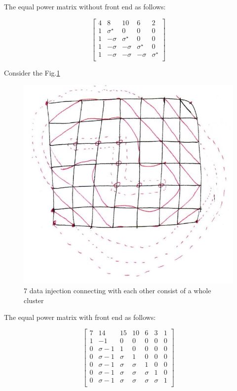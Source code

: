 The equal power matrix without front end as follows:

\begin{equation}
{
\left[ \begin{array}{ccccc}
4 & 8 & 10 & 6 & 2 \\
1 & {\sigma}^{\star} & 0 & 0 & 0 \\
1 & -\sigma & {\sigma}^{\star} & 0 & 0  \\
1 & -\sigma & -\sigma & {\sigma}^{\star} & 0  \\
1 & -\sigma & -\sigma & -\sigma & {\sigma}^{\star}\\

\end{array} 
\right ]} 
\end{equation}

\vspace*{50pt}

Consider the Fig.\ref{dense2}
\begin{figure}[h]
\centering\includegraphics[width=0.8\linewidth]{figure/dense2}
\caption{7 data injection connecting with each other consist of a whole cluster}
\label{dense2}
\end{figure}

\vspace*{20pt}
The equal power matrix with front end as follows:

\begin{equation}
{
\left[ \begin{array}{ccccccc}
7 & 14 & 15 & 10 & 6 & 3 & 1 \\
1 & -1 & 0 & 0 & 0 & 0 & 0\\
0 & \sigma -1 & 1 & 0 & 0 & 0 & 0 \\
0 & \sigma -1 & \sigma & 1 & 0 & 0 & 0 \\
0 & \sigma -1 & \sigma & \sigma & 1 & 0 & 0 \\
0 & \sigma -1 & \sigma & \sigma & \sigma & 1 & 0 \\
0 & \sigma -1 & \sigma & \sigma & \sigma & \sigma & 1 \\
\end{array} 
\right ]}  
\end{equation}

